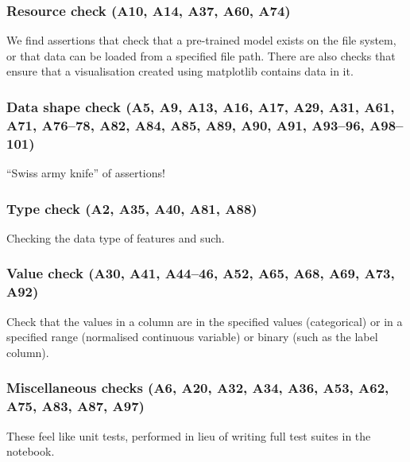 \subsubsection{Resource check (A10, A14, A37, A60, A74)}

We find assertions that check that a pre-trained model exists on the file system, or that data can be loaded from a specified file path. There are also checks that ensure that a visualisation created using matplotlib contains data in it.

\subsubsection{Data shape check (A5, A9, A13, A16, A17, A29, A31, A61, A71, A76--78, A82, A84, A85, A89, A90, A91, A93--96, A98--101)}

``Swiss army knife'' of assertions!

\subsubsection{Type check (A2, A35, A40, A81, A88)}

Checking the data type of features and such.

\subsubsection{Value check (A30, A41, A44--46, A52, A65, A68, A69, A73, A92)}

Check that the values in a column are in the specified values (categorical) or in a specified range (normalised continuous variable) or binary (such as the label column).

\subsubsection{Miscellaneous checks (A6, A20, A32, A34, A36, A53, A62, A75, A83, A87, A97)}

These feel like unit tests, performed in lieu of writing full test suites in the notebook.



%
%


